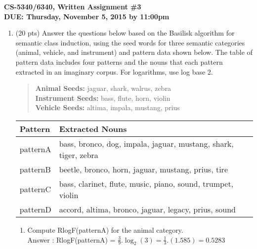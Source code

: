 \documentclass[11pt]{article}
\begin{document}
\large
\begin{center}
{\bf CS-5340/6340, Written Assignment \#3} \\
{\bf DUE: Thursday, November 5, 2015 by 11:00pm}
\end{center}
\normalsize

\begin{enumerate}  


\item (20 pts) Answer  the questions below based on  the Basilisk
  algorithm for  semantic class induction, using the seed words
 for three semantic categories ({\sc animal}, {\sc vehicle},
  and {\sc instrument}) and pattern data shown below. 
 The table of pattern data includes four patterns and the nouns that
 each pattern extracted  in an imaginary corpus.  For logarithms, use
 log base 2. 

\begin{quote}
\hspace*{.5in} {\bf Animal Seeds:} jaguar, shark, walrus, zebra \\
\hspace*{.5in} {\bf Instrument Seeds:} bass, flute, horn, violin \\
\hspace*{.5in} {\bf Vehicle Seeds:} altima, impala, mustang, prius \\
\end{quote}

\begin{center}
\begin{tabular}{ll} \hline
\textbf{Pattern} & \textbf{Extracted Nouns} \\ \hline
patternA & bass, bronco, dog, impala, jaguar, mustang, shark, tiger, zebra \\ 
patternB & beetle, bronco, horn, jaguar, mustang, prius, tire \\ 
patternC & bass, clarinet, flute, music, piano, sound, trumpet, violin \\ 
patternD & accord, altima, bronco, jaguar, legacy, prius, sound \\ \hline 
\end{tabular}
\end{center}

\vspace*{.2in}

\begin{enumerate}
\item Compute RlogF(patternA) for the {\sc animal} category.\\ 
Answer : RlogF(patternA) = $\frac{3}{9}.\log_2 (3) = \frac{1}{3}.(1.585) = 0.5283$


\end{enumerate}
\end{enumerate}
\end{document}
